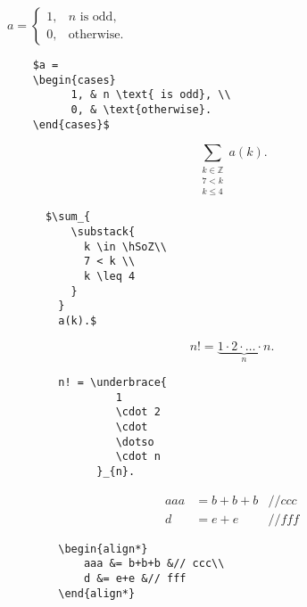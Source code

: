 \documentclass[a4paper,10pt,landscape]{article}
\theoremstyle{definition}
\theoremstyle{remark}
\newcommand{\hSoZ}  {\ensuremath{\mathbb{Z}}}      %
\begin{document}
\begin{multicols}{3}
\begin{multicols}{2}
	$a = 
	\begin{cases}
		1, & n \text{ is odd}, \\
		0, & \text{otherwise}.
	\end{cases}$
\columnbreak
	\begin{verbatim}
	$a = 
	\begin{cases}
		  1, & n \text{ is odd}, \\
		  0, & \text{otherwise}.
	\end{cases}$
	\end{verbatim}
\end{multicols}
\begin{multicols}{2}
	\[\sum_{\substack{k \in \hSoZ\\ 7 < k \\ k \leq 4}} a(k).\]
\columnbreak
	\begin{verbatim}
	  $\sum_{
	      \substack{
	        k \in \hSoZ\\ 
	        7 < k \\ 
	        k \leq 4
	      }
	    } 
	    a(k).$
	\end{verbatim}
\end{multicols}
\begin{multicols}{2}
	\[n! = \underbrace{1 \cdot 2 \cdot \dotso \cdot n}_{n}.\]
\columnbreak
	\begin{verbatim}
		n! = \underbrace{
		         1 
		         \cdot 2 
		         \cdot 
		         \dotso 
		         \cdot n
		      }_{n}.
	\end{verbatim}
\end{multicols}
\begin{multicols}{2}
		\begin{align*}
			aaa &= b+b+b &// ccc\\
			d &= e+e &// fff
		\end{align*}
\columnbreak
	\begin{verbatim}
		\begin{align*}
			aaa &= b+b+b &// ccc\\
			d &= e+e &// fff
		\end{align*}
	\end{verbatim}
\end{multicols}




\end{multicols}
\end{document}

